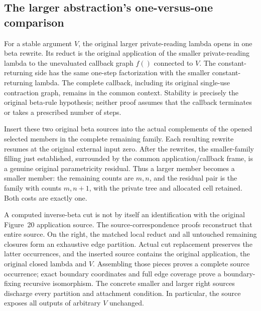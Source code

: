 \subsection{The larger abstraction's one-versus-one comparison}
For a stable argument $V$, the original larger private-reading lambda opens
in one beta rewrite. Its reduct is the original application of the smaller
private-reading lambda to the unevaluated callback graph $f()$ connected to
$V$. The constant-returning side has the same one-step factorization with
the smaller constant-returning lambda. The complete callback, including its
original single-use contraction graph, remains in the common context.
Stability is precisely the original beta-rule hypothesis; neither proof
assumes that the callback terminates or takes a prescribed number of steps.

Insert these two original beta sources into the actual complements of the
opened selected members in the complete remaining family. Each resulting
rewrite resumes at the original external input zero. After the rewrites,
the smaller-family filling just established, surrounded by the common
application/callback frame, is a genuine original parametricity residual.
Thus a larger member becomes a smaller member: the remaining counts are
$m,n$, and the residual pair is the family with counts $m,n+1$, with the
private tree and allocated cell retained. Both costs are exactly one.

\par{}
\par{}
\par{}
%

A computed inverse-beta cut is not by itself an identification with the
original Figure~20 application source. The source-correspondence proofs
reconstruct that entire source. On the right, the matched local reduct and
all untouched remaining closures form an exhaustive edge partition. Actual
cut replacement preserves the latter occurrences, and the inserted source
contains the original application, the original closed lambda and $V$.
Assembling those pieces proves a complete source occurrence; exact boundary
coordinates and full edge coverage prove a boundary-fixing recursive
isomorphism. The concrete smaller and larger right sources discharge every
partition and attachment condition. In particular, the source exposes all
outputs of arbitrary $V$ unchanged.


